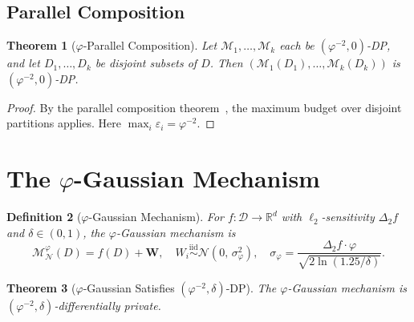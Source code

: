 \documentclass[12pt]{article}
\newtheorem{theorem}{Theorem}
\newtheorem{definition}[theorem]{Definition}
\newcommand{\AMOR}{\varphi^{-2}}
\newcommand{\PHI}{\varphi}
\newcommand{\Gauss}{\mathcal{N}}
\newcommand{\eps}{\varepsilon}
\newcommand{\Mech}{\mathcal{M}}
\newcommand{\DB}{\mathcal{D}}
\newcommand{\R}{\mathbb{R}}
\newcommand{\Sens}{\Delta}
\begin{document}
\subsection{Parallel Composition}

\begin{theorem}[$\varphi$-Parallel Composition]
\label{thm:par-comp}
Let $\Mech_1, \ldots, \Mech_k$ each be $(\AMOR, 0)$-DP, and let $D_1, \ldots,
D_k$ be disjoint subsets of $D$.  Then $(\Mech_1(D_1), \ldots, \Mech_k(D_k))$
is $(\AMOR, 0)$-DP.
\end{theorem}

\begin{proof}
By the parallel composition theorem~\cite{McSherry2009}, the maximum budget over
disjoint partitions applies.  Here $\max_i \eps_i = \AMOR$.
\end{proof}

\section{The $\varphi$-Gaussian Mechanism}
\label{sec:gaussian}

\begin{definition}[$\varphi$-Gaussian Mechanism]
\label{def:phi-gauss}
For $f : \DB \to \R^d$ with $\ell_2$-sensitivity $\Sens_2 f$ and $\delta \in
(0,1)$, the \emph{$\varphi$-Gaussian mechanism} is
\[
  \Mech_\Gauss^\PHI(D) = f(D) + \mathbf{W},
  \quad W_i \overset{\mathrm{iid}}{\sim}
  \Gauss\!\left(0,\, \sigma_\PHI^2\right),
  \quad
  \sigma_\PHI = \frac{\Sens_2 f \cdot \PHI}{\sqrt{2\ln(1.25/\delta)}}.
\]
\end{definition}

\begin{theorem}[$\varphi$-Gaussian Satisfies $(\AMOR, \delta)$-DP]
\label{thm:phi-gauss}
The $\varphi$-Gaussian mechanism is $(\AMOR, \delta)$-differentially private.
\end{theorem}
\end{document}
